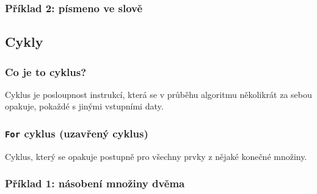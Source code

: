 \documentclass[aspectratio=169,11pt]{beamer}
\begin{document}
\begin{frame}
 \frametitle{Příklad 2: písmeno ve slově}
 \centering
 \begin{minipage}{.9\textwidth}
  \begin{algorithm}[H]
   \DontPrintSemicolon

   \BlankLine
  \end{algorithm}
 \end{minipage}
\end{frame}

\subsection[Cykly]{Cykly}

\begin{frame}
 \frametitle{Co je to cyklus?}
 \begin{tcolorbox}[title=Cyklus,center,width=.9\textwidth]
  Cyklus je posloupnost instrukcí, která se v průběhu algoritmu
  \alert{několikrát za sebou opakuje}, pokaždé s jinými vstupními daty.
 \end{tcolorbox}
\end{frame}

\begin{frame}
 \frametitle{\texttt{For} cyklus (uzavřený cyklus)}
 \begin{tcolorbox}[title=\texttt{For} cyklus,center,width=.9\textwidth]
  Cyklus, který se opakuje postupně pro \alert{všechny prvky z nějaké konečné
  množiny}.
 \end{tcolorbox}
\end{frame}

\begin{frame}
 \frametitle{Příklad 1: násobení množiny dvěma}
 \centering
\end{frame}
\end{document}
